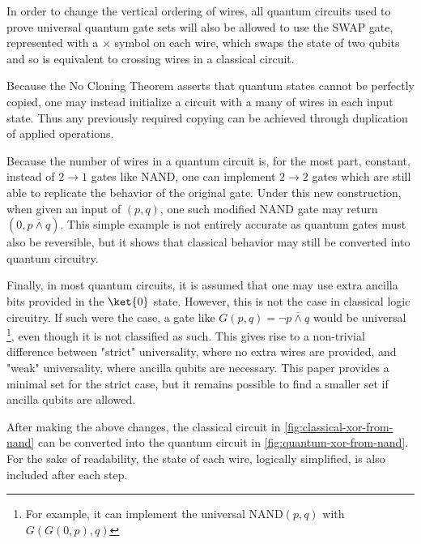 \documentclass[12pt]{article}
\newcommand{\nand}{\overline{\land}}
\begin{document}
In order to change the vertical ordering of wires, all quantum circuits used to prove universal quantum gate sets will also be allowed to use the SWAP gate, represented with a $\times$ symbol on each wire, which swaps the state of two qubits and so is equivalent to crossing wires in a classical circuit.

Because the No Cloning Theorem asserts that quantum states cannot be perfectly copied, one may instead initialize a circuit with a many of wires in each input state. Thus any previously required copying can be achieved through duplication of applied operations.

Because the number of wires in a quantum circuit is, for the most part, constant, instead of $2 \to 1$ gates like NAND, one can implement $2 \to 2$ gates which are still able to replicate the behavior of the original gate. Under this new construction, when given an input of $(p, q)$, one such modified NAND gate may return $(0, p \nand q)$. This simple example is not entirely accurate as quantum gates must also be reversible, but it shows that classical behavior may still be converted into quantum circuitry.

Finally, in most quantum circuits, it is assumed that one may use extra ancilla bits provided in the $\ket{0}$ state. However, this is not the case in classical logic circuitry. If such were the case, a gate like 
$G(p, q) = \neg p \nand q$
would be universal \footnote{For example, it can implement the universal $\text{NAND}(p, q)$ with $G(G(0, p), q)$}, even though it is not classified as such. This gives rise to a non-trivial difference between "strict"  universality, where no extra wires are provided, and "weak" universality, where ancilla qubits are necessary. This paper provides a minimal set for the strict case, but it remains possible to find a smaller set if ancilla qubits are allowed.

After making the above changes, the classical circuit in \autoref{fig:classical-xor-from-nand} can be converted into the quantum circuit in
\autoref{fig:quantum-xor-from-nand}. For the sake of readability, the state of each wire, logically simplified, is also included after each step.
\end{document}
